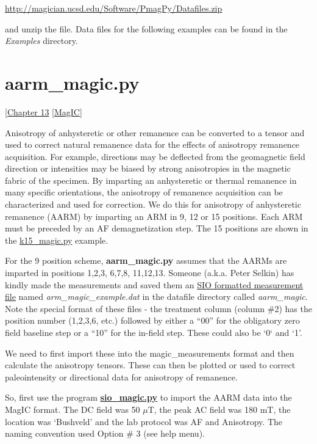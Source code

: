 \documentclass[11pt]{book}
\begin{document}
{{{{ \url{http://magician.ucsd.edu/Software/PmagPy/Datafiles.zip} }
 
\noindent  and unzip the file.   Data files for the following examples can be found in the {\it Examples} directory.  


%
\section {\bf aarm\_magic.py}
{ [\href{http://magician.ucsd.edu/Essentials/WebBook2.html#paleomagnetic_tensors}{Chapter 13} 
\href{#MagIC}{[MagIC]}
\label{ex:aarm_magic}

Anisotropy of anhysteretic or other remanence can be converted to a tensor and used to correct natural remanence data for the effects of anisotropy remanence acquisition.  For example, directions may be deflected from the geomagnetic field direction or intensities may be biased by strong anisotropies in the magnetic fabric of the specimen.  By imparting an anhysteretic or thermal remanence in many specific orientations, the anisotropy of remanence acquisition can be characterized and used for correction.   We do this for anisotropy of anhysteretic remanence (AARM) by imparting an ARM in 9, 12  or 15 positions.  Each ARM must be preceded by an AF demagnetization step.    The 15 positions are shown in the \href{#k15_magic.py}{k15\_magic.py} example. 




 For the 9 position scheme,  {\bf aarm\_magic.py} assumes that the AARMs are imparted in positions 1,2,3, 6,7,8, 11,12,13.    Someone (a.k.a. Peter Selkin) has kindly made the measurements and saved them an \href{#sio_magic.py}{SIO formatted measurement file} named {\it arm\_magic\_example.dat} in the datafile directory called {\it aarm\_magic}.   Note the special format of these files - the treatment column (column \#2) has the position number (1,2,3,6, etc.) followed by either a ``00'' for the obligatory zero field baseline step or a ``10'' for the in-field step.  These could also be `0` and `1'.    
 
 We need to first import these into the magic\_measurements format and then calculate the anisotropy tensors.  These can then be plotted or used to correct paleointensity or directional data for anisotropy of remanence.  
 
So,  first use the program \href{#sio_magic.py}{\bf sio\_magic.py}  to import the AARM data  into the MagIC format.  The DC field was 50 $\mu$T, the peak AC field was 180 mT, the location was `Bushveld' and the lab protocol was AF and Anisotropy.   The naming convention used Option \# 3 (see help menu). 

}}}}
\end{document}
